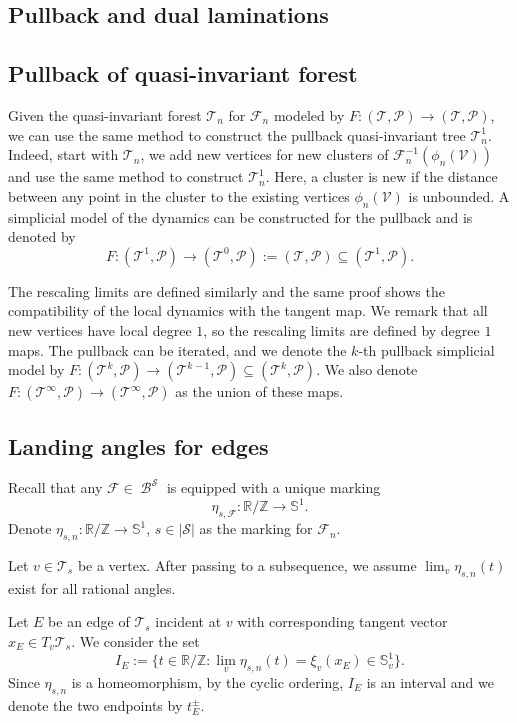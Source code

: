 \documentclass[11pt, reqno]{amsart}
\numberwithin{equation}{section}
\theoremstyle{plain}
\theoremstyle{theorem}
\theoremstyle{definition}
\newcommand{\R}{\mathbb{R}}
\newcommand{\Z}{\mathbb{Z}}
\newcommand{\bp}{\mathcal{F}}
\DeclareMathOperator{\BP}{\mathcal{B}}
\numberwithin{figure}{section}
\begin{document}
\subsection{Pullback and dual laminations}
\subsection*{Pullback of quasi-invariant forest}
Given the quasi-invariant forest $\mathcal{T}_n$ for $\bp_n$ modeled by $F:(\mathcal{T}, \mathcal{P}) \longrightarrow (\mathcal{T}, \mathcal{P})$, we can use the same method to construct the pullback quasi-invariant tree $\mathcal{T}^1_n$.
Indeed, start with $\mathcal{T}_n$, we add new vertices for new clusters of $\bp_n^{-1}(\phi_n(\mathcal{V}))$ and use the same method to construct $\mathcal{T}^1_n$.
Here, a cluster is new if the distance between any point in the cluster to the existing vertices $\phi_n(\mathcal{V})$ is unbounded.
A simplicial model of the dynamics can be constructed for the pullback and is denoted by 
$$
F: (\mathcal{T}^1, \mathcal{P})\longrightarrow (\mathcal{T}^0, \mathcal{P}) := (\mathcal{T}, \mathcal{P})\subseteq (\mathcal{T}^1, \mathcal{P}).
$$ 

The rescaling limits are defined similarly and the same proof shows the compatibility of the local dynamics with the tangent map.
We remark that all new vertices have local degree $1$, so the rescaling limits are defined by degree $1$ maps.
The pullback can be iterated, and we denote the $k$-th pullback simplicial model by 
$F: (\mathcal{T}^k, \mathcal{P}) \longrightarrow (\mathcal{T}^{k-1}, \mathcal{P}) \subseteq (\mathcal{T}^k, \mathcal{P})$.
We also denote $F: (\mathcal{T}^\infty, \mathcal{P}) \longrightarrow (\mathcal{T}^\infty, \mathcal{P})$ as the union of these maps.

\subsection*{Landing angles for edges}
Recall that any $\bp\in \BP^\mathcal{S}$ is equipped with a unique marking
$$
\eta_{s, \bp}: \R/\Z \longrightarrow \mathbb{S}^1.
$$
Denote $\eta_{s, n}: \R/\Z \longrightarrow \mathbb{S}^1$, $s\in |\mathcal{S}|$ as the marking for $\bp_n$.

Let $v\in \mathcal{T}_s$ be a vertex.
After passing to a subsequence, we assume $\lim_v \eta_{s,n}(t)$ exist for all rational angles.

Let $E$ be an edge of $\mathcal{T}_s$ incident at $v$ with corresponding tangent vector $x_E \in T_v\mathcal{T}_s$.
We consider the set
$$
I_E:=\{t \in \R/\Z: \lim_v \eta_{s,n}(t) = \xi_v(x_E) \in \mathbb{S}^1_v\}.
$$
Since $\eta_{s,n}$ is a homeomorphism, by the cyclic ordering, $I_E$ is an interval and we denote the two endpoints by $t^\pm_E$.
\end{document}
